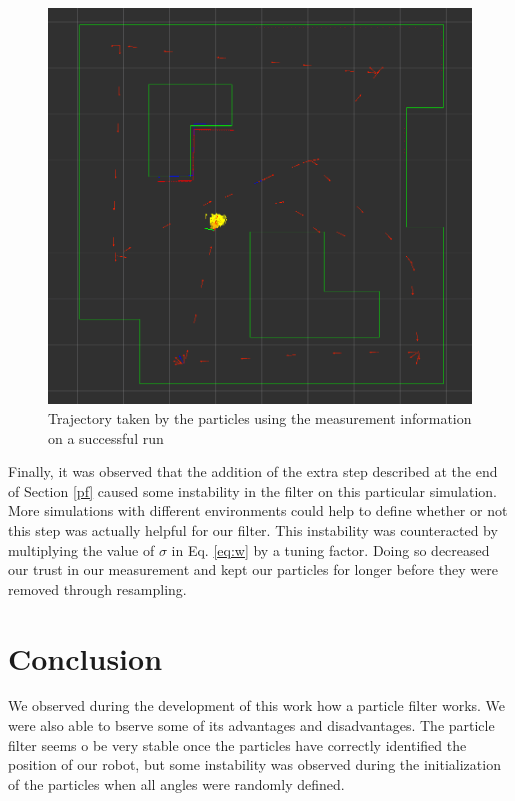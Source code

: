 \documentclass[journal]{IEEEtran}
\begin{document}
\begin{figure}
	\centering
	\includegraphics[width=0.8\linewidth]{figures/final.png}
	\caption{Trajectory taken by the particles using the measurement information on a successful run}
	\label{final}
\end{figure}

Finally, it was observed that the addition of the extra step described at the end of Section \ref{pf} caused some instability in the filter on this particular simulation. More simulations with different environments could help to define whether or not this step was actually helpful for our filter. This instability was counteracted by multiplying the value of $\sigma$ in Eq. \ref{eq:w} by a tuning factor. Doing so decreased our trust in our measurement and kept our particles for longer before they were removed through resampling.




\section{Conclusion}\label{conclusion}

We observed during the development of this work how a particle filter works. We were also able to bserve some of its advantages and disadvantages. The particle filter seems o be very stable once the particles have correctly identified the position of our robot, but some instability was observed during the initialization of the particles when all angles were randomly defined.
\end{document}
